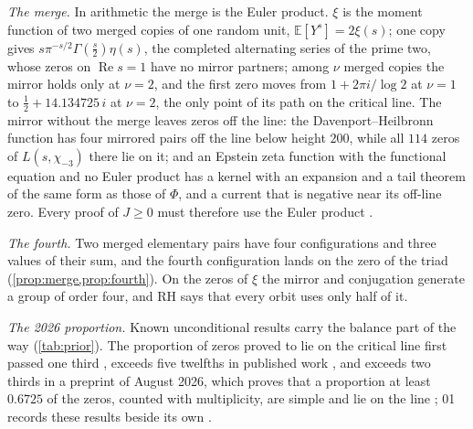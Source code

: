 \documentclass[11pt]{article}
\theoremstyle{definition}\newtheorem{definition}[theorem]{Definition}
\theoremstyle{remark}\newtheorem{remark}[theorem]{Remark}
\renewcommand{\Re}{\operatorname{Re}}\renewcommand{\Im}{\operatorname{Im}}
\begin{document}
\emph{The merge.} In arithmetic the merge is the Euler product. $\xi$ is the moment function of two merged copies of one random unit, $\mathbb E[Y^s]=2\xi(s)$; one copy gives $s\pi^{-s/2}\Gamma(\frac s2)\eta(s)$, the completed alternating series of the prime two, whose zeros on $\Re s=1$ have no mirror partners; among $\nu$ merged copies the mirror holds only at $\nu=2$, and the first zero moves from $1+2\pi i/\log2$ at $\nu=1$ to $\frac12+14.134725\,i$ at $\nu=2$, the only point of its path on the critical line. The mirror without the merge leaves zeros off the line: the Davenport--Heilbronn function has four mirrored pairs off the line below height $200$, while all $114$ zeros of $L(s,\chi_{-3})$ there lie on it; and an Epstein zeta function with the functional equation and no Euler product has a kernel with an expansion and a tail theorem of the same form as those of $\Phi$, and a current that is negative near its off-line zero. Every proof of $J\ge0$ must therefore use the Euler product \cite{SMath}.

\emph{The fourth.} Two merged elementary pairs have four configurations and three values of their sum, and the fourth configuration lands on the zero of the triad (\cref{prop:merge,prop:fourth}). On the zeros of $\xi$ the mirror and conjugation generate a group of order four, and RH says that every orbit uses only half of it.

\emph{The 2026 proportion.} Known unconditional results carry the balance part of the way (\cref{tab:prior}). The proportion of zeros proved to lie on the critical line first passed one third \cite{Levinson}, exceeds five twelfths in published work \cite{PRZZ}, and exceeds two thirds in a preprint of August 2026, which proves that a proportion at least $0.6725$ of the zeros, counted with multiplicity, are simple and lie on the line \cite{AF}; 01 records these results beside its own \cite{SMath}.
\end{document}
